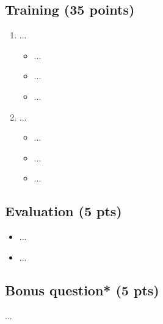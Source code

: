 \documentclass[a4paper]{article}
\begin{document}
\subsection*{Training (35 points)}
\begin{enumerate}
    \item ...
    \begin{itemize}
        \item ...
        \item ...
        \item ...
    \end{itemize}
    \item ...
    \begin{itemize}
        \item ...
         \item ...
        \item ...
    \end{itemize}
\end{enumerate}

\subsection*{Evaluation (5 pts)}
\begin{itemize}
    \item...
    \item ...
\end{itemize}


\subsection*{Bonus question* (5 pts)}
...
\end{document}
